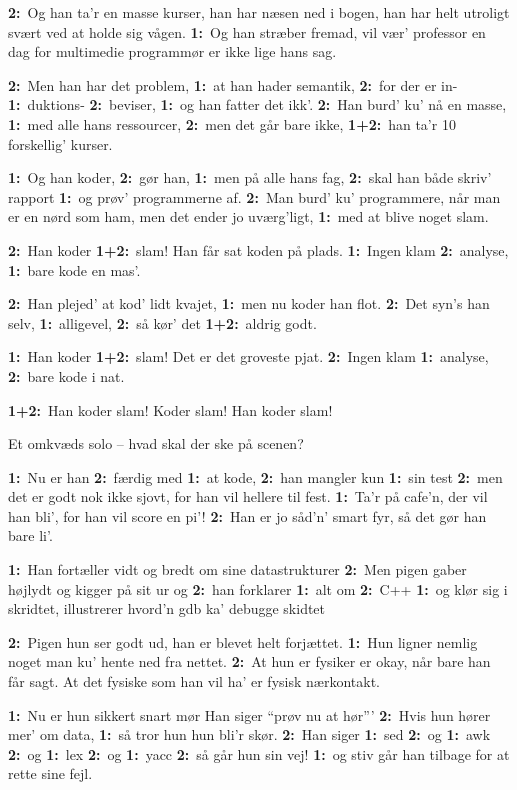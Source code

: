 \documentclass[danish]{article}
\newcommand{\et}{\textbf{1:}~}
\renewcommand{\to}{\textbf{2:}~}
\newcommand{\etto}{\textbf{1+2:}~}
\begin{document}
\begin{song}
\to{}Og han ta'r en masse kurser,
han har næsen ned i bogen,
han har helt utroligt svært 
ved at holde sig vågen.
\et{}Og han stræber fremad,
vil vær' professor en dag
for multimedie programmør er
ikke lige hans sag.

\to{}Men han har det problem,
\et{}at han hader semantik,
\to{}for der er in- \et{}duktions- \to{}beviser,
\et{}og han fatter det ikk'.
\to{}Han burd' ku' nå en masse,
\et{}med alle hans ressourcer,
\to{}men det går bare ikke, 
\etto{}han ta'r 10 forskellig' kurser.

\et{}Og han koder, \to{}gør han,
\et{}men på alle hans fag,
\to{}skal han både skriv' rapport
\et{}og prøv' programmerne af.
\to{}Man burd' ku' programmere,
når man er en nørd som ham,
men det ender jo uværg'ligt,
\et{}med at blive noget slam.

\newpage

 \to{}Han koder \etto{}slam!
Han får sat koden på plads.
\et{}Ingen klam \to{}analyse,
\et{}bare kode en mas'.

\to{}Han plejed' at kod' lidt kvajet,
\et{}men nu koder han flot.
\to{}Det syn's han selv, \et{}alligevel,
\to{}så kør' det \etto{}aldrig godt.

\et{}Han koder \etto{}slam!
Det er det groveste pjat.
\to{}Ingen klam \et{}analyse,
\to{}bare kode i nat.

\etto{}Han koder slam!
Koder slam!
Han koder slam!

\scene Et omkvæds solo -- hvad skal der ske på scenen?

\newpage

 \et{}Nu er han \to{}færdig med \et{}at kode, 
\to{}han mangler kun \et{}sin test
\to{}men det er godt nok ikke sjovt,
for han vil hellere til fest.
\et{}Ta'r på cafe'n, der vil han bli', 
for han vil score en pi'!
\to{}Han er jo såd'n' smart fyr, 
så det gør han bare li'.

\et{}Han fortæller vidt og bredt 
om sine datastrukturer
\to{}Men pigen gaber højlydt 
og kigger på sit ur og
\to{}han forklarer \et{}alt om \to{}C++ 
\et{}og klør sig i skridtet,
illustrerer hvord'n gdb 
ka' debugge skidtet

\to{}Pigen hun ser godt ud, 
han er blevet helt forjættet.
\et{}Hun ligner nemlig noget 
man ku' hente ned fra nettet.
\to{}At hun er fysiker er okay, 
når bare han får sagt.
At det fysiske som han vil ha' 
er fysisk nærkontakt.

\et{}Nu er hun sikkert snart mør
Han siger ``prøv nu at hør'''
\to{}Hvis hun hører mer' om data, 
\et{}så tror hun hun bli'r skør.
\to{}Han siger \et{}sed 
               \to{}og 
               \et{}awk 
               \to{}og 
               \et{}lex 
               \to{}og 
               \et{}yacc
\to{}så går hun sin vej!
\et{}og stiv går han tilbage 
for at rette sine fejl.


\end{song}
\end{document}
